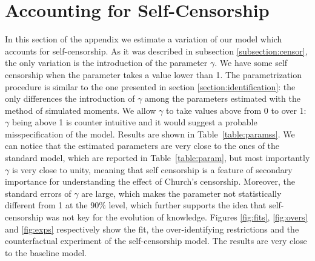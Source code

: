 \section{Accounting for Self-Censorship}
In this section of the appendix we estimate a variation of our model which accounts for self-censorship. As it was described in subsection \ref{subsection:censor}, the only variation is the introduction of the parameter $\gamma$. We have some self censorship when the parameter takes a value lower than 1. The parametrization procedure is similar to the one presented in section \ref{section:identification}: the only differences the introduction of $\gamma$ among the parameters estimated with the method of simulated moments. We allow $\gamma$ to take values above from 0 to over 1: $\gamma$ being above 1 is counter intuitive and it would suggest a probable misspecification of the model.  Results are shown in Table~\ref{table:paramss}. We can notice that the estimated parameters are very close to the ones of the standard model, which are reported in Table~\ref{table:param}, but most importantly $\gamma$ is very close to unity, meaning that self censorship is a feature of secondary importance for understanding the effect of Church's censorship. Moreover, the standard errors of $\gamma$ are large, which makes the parameter not statistically different from 1 at the $90\%$ level, which further supports the idea that self-censorship was not key for the evolution of knowledge. Figures \ref{fig:fits}, \ref{fig:overs} and \ref{fig:exps} respectively show the fit, the over-identifying restrictions and the counterfactual experiment of the self-censorship model. The results are very close to the baseline model.

